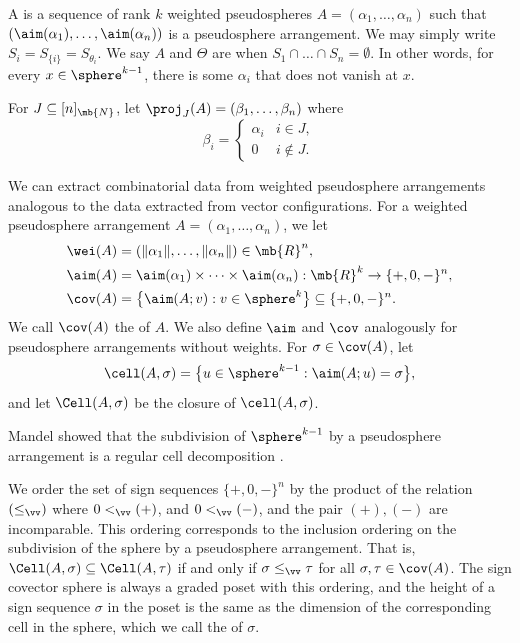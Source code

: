 A  is a sequence of rank $k$ weighted pseudospheres ${A} = (\alpha_1,\dots,\alpha_n)$ such that $(\aim(\alpha_1),\dots,\aim(\alpha_n))$ is a pseudosphere arrangement.
We may simply write $S_i = S_{\{i\}} = S_{\theta_i}$.
We say $A$ and $\Theta$ are  when $S_{1} \cap \dots \cap S_{n} = \emptyset$. In other words, for every $x \in \sphere^{k-1}$, there is some $\alpha_i$ that does not vanish at $x$.

For $J \subseteq [n]_\mb{N}$, let $\proj_J(A) = (\beta_1,\dots,\beta_n)$ where
\[\beta_i =
\begin{cases} \alpha_i & i\in J, \\ 0 & i \not\in J .\end{cases} \]

We can extract combinatorial data from weighted pseudosphere arrangements analogous to the data extracted from vector configurations.
For a weighted pseudosphere arrangement $A = (\alpha_1,\dots,\alpha_n)$,
we let
\begin{align*}
\wei(A) &= (\|\alpha_1\|,\dots,\|\alpha_n\|) \in \mb{R}^n, \\
\aim (A) &= \aim(\alpha_1)\times \dots\times \aim(\alpha_n) : \mb{R}^k \to \{+,0,-\}^n, \\
\cov (A) &= \bigl\{ \aim (A; v) :v \in \sphere^{k} \bigr\} \subseteq \{+,0,-\}^n.
\end{align*}
We call $\cov (A)$ the  of $A$.
We also define $\aim$ and $\cov$ analogously for pseudosphere arrangements without weights.
For $\sigma \in \cov (A)$, let
\[ \cell(A,\sigma) = \bigl\{u \in \sphere^{k-1}:\aim (A; u) = \sigma \bigr\}, \]
and let $\Cell(A,\sigma)$ be the closure of $\cell(A,\sigma)$.

\begin{remark}\label{remark-cell}
Mandel showed that the subdivision of $\sphere^{k-1}$ by a pseudosphere arrangement is a regular cell decomposition \cite{edmonds1978topology}.
\end{remark}

We order the set of sign sequences $\{+,0,-\}^n$ by the product of the relation $(\leq_\vv)$ where ${0 <_\vv ({+})}$, and ${0 <_\vv ({-})}$, and the pair $({+}),({-})$ are incomparable.
This ordering corresponds to the inclusion ordering on the subdivision of the sphere by a pseudosphere arrangement. That is, $\Cell(A,\sigma) \subseteq \Cell(A,\tau)$ if and only if $\sigma \leq_\vv \tau$ for all $\sigma,\tau \in \cov(A)$.
The sign covector sphere is always a graded poset with this ordering,
and the height of a sign sequence $\sigma$ in the poset is the same as the dimension of the corresponding cell in the sphere, which we call the  of $\sigma$.


